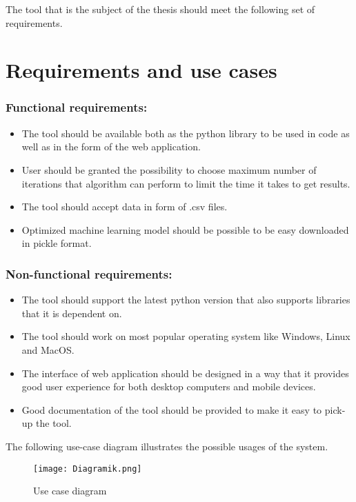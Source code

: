 \documentclass[a4paper,twoside,12pt]{book}
\begin{document}
The tool that is the subject of the thesis should meet the following set of requirements.


\section{Requirements and use cases}

\subsubsection{Functional requirements:}

\begin{itemize}
    \item The tool should be available both as the python library to be used in code as well as in the form of the web application.
    \item User should be granted the possibility to choose maximum number of iterations that algorithm can perform to limit the time it takes to get results.
    \item The tool should accept data in form of .csv files. 
    \item Optimized machine learning model should be possible to be easy downloaded in pickle format.
\end{itemize}
\subsubsection{Non-functional requirements:}
\begin{itemize}
    \item The tool should support the latest python version that also supports libraries that it is dependent on.
    \item The tool should work on most popular operating system like Windows, Linux and MacOS.
    \item The interface of web application should be designed in a way that it provides good user experience for both desktop computers and mobile devices.
    \item Good documentation of the tool should be provided to make it easy to pick-up the tool.
\end{itemize}

The following use-case diagram illustrates the possible usages of the system.

\begin{figure}[h]
    \centering
    \texttt{[image: Diagramik.png]}
    \caption{Use case diagram}
    \label{fig:mesh1}
\end{figure}
\end{document}
